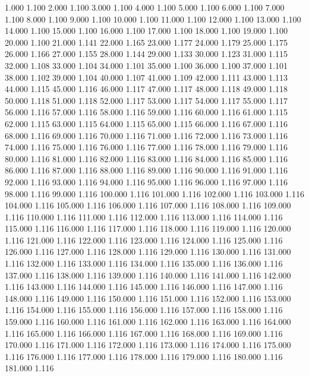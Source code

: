 1.000 1.100 
2.000 1.100 
3.000 1.100 
4.000 1.100 
5.000 1.100 
6.000 1.100 
7.000 1.100 
8.000 1.100 
9.000 1.100 
10.000 1.100 
11.000 1.100 
12.000 1.100 
13.000 1.100 
14.000 1.100 
15.000 1.100 
16.000 1.100 
17.000 1.100 
18.000 1.100 
19.000 1.100 
20.000 1.100 
21.000 1.141 
22.000 1.165 
23.000 1.177 
24.000 1.179 
25.000 1.175 
26.000 1.166 
27.000 1.155 
28.000 1.144 
29.000 1.133 
30.000 1.123 
31.000 1.115 
32.000 1.108 
33.000 1.104 
34.000 1.101 
35.000 1.100 
36.000 1.100 
37.000 1.101 
38.000 1.102 
39.000 1.104 
40.000 1.107 
41.000 1.109 
42.000 1.111 
43.000 1.113 
44.000 1.115 
45.000 1.116 
46.000 1.117 
47.000 1.117 
48.000 1.118 
49.000 1.118 
50.000 1.118 
51.000 1.118 
52.000 1.117 
53.000 1.117 
54.000 1.117 
55.000 1.117 
56.000 1.116 
57.000 1.116 
58.000 1.116 
59.000 1.116 
60.000 1.116 
61.000 1.115 
62.000 1.115 
63.000 1.115 
64.000 1.115 
65.000 1.115 
66.000 1.116 
67.000 1.116 
68.000 1.116 
69.000 1.116 
70.000 1.116 
71.000 1.116 
72.000 1.116 
73.000 1.116 
74.000 1.116 
75.000 1.116 
76.000 1.116 
77.000 1.116 
78.000 1.116 
79.000 1.116 
80.000 1.116 
81.000 1.116 
82.000 1.116 
83.000 1.116 
84.000 1.116 
85.000 1.116 
86.000 1.116 
87.000 1.116 
88.000 1.116 
89.000 1.116 
90.000 1.116 
91.000 1.116 
92.000 1.116 
93.000 1.116 
94.000 1.116 
95.000 1.116 
96.000 1.116 
97.000 1.116 
98.000 1.116 
99.000 1.116 
100.000 1.116 
101.000 1.116 
102.000 1.116 
103.000 1.116 
104.000 1.116 
105.000 1.116 
106.000 1.116 
107.000 1.116 
108.000 1.116 
109.000 1.116 
110.000 1.116 
111.000 1.116 
112.000 1.116 
113.000 1.116 
114.000 1.116 
115.000 1.116 
116.000 1.116 
117.000 1.116 
118.000 1.116 
119.000 1.116 
120.000 1.116 
121.000 1.116 
122.000 1.116 
123.000 1.116 
124.000 1.116 
125.000 1.116 
126.000 1.116 
127.000 1.116 
128.000 1.116 
129.000 1.116 
130.000 1.116 
131.000 1.116 
132.000 1.116 
133.000 1.116 
134.000 1.116 
135.000 1.116 
136.000 1.116 
137.000 1.116 
138.000 1.116 
139.000 1.116 
140.000 1.116 
141.000 1.116 
142.000 1.116 
143.000 1.116 
144.000 1.116 
145.000 1.116 
146.000 1.116 
147.000 1.116 
148.000 1.116 
149.000 1.116 
150.000 1.116 
151.000 1.116 
152.000 1.116 
153.000 1.116 
154.000 1.116 
155.000 1.116 
156.000 1.116 
157.000 1.116 
158.000 1.116 
159.000 1.116 
160.000 1.116 
161.000 1.116 
162.000 1.116 
163.000 1.116 
164.000 1.116 
165.000 1.116 
166.000 1.116 
167.000 1.116 
168.000 1.116 
169.000 1.116 
170.000 1.116 
171.000 1.116 
172.000 1.116 
173.000 1.116 
174.000 1.116 
175.000 1.116 
176.000 1.116 
177.000 1.116 
178.000 1.116 
179.000 1.116 
180.000 1.116 
181.000 1.116 
